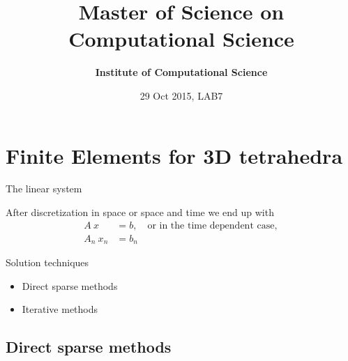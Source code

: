 \documentclass[handout]{beamer}
{
\usepackage{fullpage}
\usepackage{hyperref}
\usepackage{amssymb} 
}
\title[PDE LAB6, 2015]{Master of Science on Computational Science}
\author[prof. Dr. Rolf Krause \& Dr. Drosos Kourounis] %
{\textbf{Institute of Computational Science}}
\institute[ICS] %
{
prof. Dr. Rolf Krause \& Dr. Drosos Kourounis
}
\date[29 Oct, 2015]{29 Oct 2015, LAB7}
\begin{document}
\begin{frame}
  \titlepage
\end{frame}

\section{Finite Elements for 3D tetrahedra}


\begin{frame}{The linear system}
\begin{block}{After discretization in space or space and time we end up with}
\begin{align*}
           A\: x &= b, \quad \text{or in the time dependent case}, \\
           A_n\: x_n &= b_n
\end{align*}
\end{block}

\begin{block}{Solution techniques}
\begin{itemize}
\item Direct sparse methods
\item Iterative methods
\end{itemize}
\end{block}
\end{frame}


\subsection{Direct sparse methods}
\end{document}
